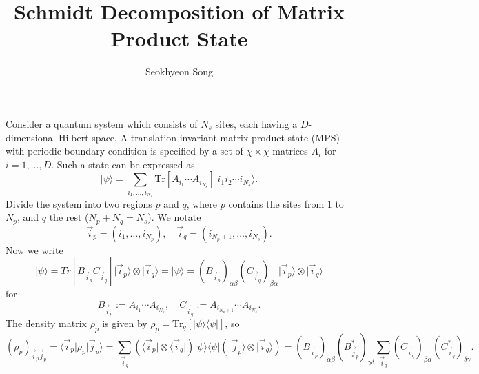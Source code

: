 \documentclass[11pt]{article}
\renewcommand\bra[1]{{\langle{#1}|}}
\renewcommand\ket[1]{{|{#1}\rangle}}
\begin{document}
	\title{Schmidt Decomposition of Matrix Product State}
	\author{Seokhyeon Song}
	\maketitle
	
	Consider a quantum system which consists of $N_{s}$ sites, each having a $D$-dimensional Hilbert space.
	A translation-invariant matrix product state (MPS) with periodic boundary condition is specified by a set of $\chi\times\chi$ matrices $A_{i}$ for $i=1,\dots,D$.
	Such a state can be expressed as
	\[\ket{\psi}=\sum_{i_{1},\dots,i_{N_{s}}}\mathrm{Tr}[A_{i_{1}}\cdots A_{i_{N_{s}}}]\ket{i_{1}i_{2}\cdots i_{N_{s}}}.\]
	Divide the system into two regions $p$ and $q$, where $p$ contains the sites from $1$ to $N_{p}$, and $q$ the rest ($N_{p}+N_{q}=N_{s}$).
	We notate
	\[\vec{i}_{p}=(i_{1},\dots,i_{N_{p}}),\quad\vec{i}_{q}=(i_{N_{p}+1},\dots,i_{N_{s}}).\]
	Now we write
	\[\ket{\psi}=Tr[B_{\vec{i}_{p}}C_{\vec{i}_{q}}]\ket{\vec{i}_{p}}\otimes\ket{\vec{i}_{q}}=\ket{\psi}=(B_{\vec{i}_{p}})_{\alpha\beta}(C_{\vec{i}_{q}})_{\beta\alpha}\ket{\vec{i}_{p}}\otimes\ket{\vec{i}_{q}}\]
	for
	\[B_{\vec{i}_{p}}:=A_{i_{1}}\cdots A_{i_{N_{p}}},\quad C_{\vec{i}_{q}}:=A_{i_{N_{p}+1}}\cdots A_{i_{N_{s}}}.\]
	The density matrix $\rho_{p}$ is given by $\rho_{p}=\mathrm{Tr}_{q}[\ket{\psi}\bra{\psi}]$, so
	\[(\rho_{p})_{\vec{i}_{p}\vec{j}_{p}}=\bra{\vec{i}_{p}}\rho_{p}\ket{\vec{j}_{p}}=\sum_{\vec{i}_{q}}(\bra{\vec{i}_{p}}\otimes\bra{\vec{i}_{q}})\ket{\psi}\bra{\psi}(\ket{\vec{j}_{p}}\otimes\ket{\vec{i}_{q}})=(B_{\vec{i}_{p}})_{\alpha\beta}(B_{\vec{j}_{p}}^{\ast})_{\gamma\delta}\sum_{\vec{i}_{q}}(C_{\vec{i}_{q}})_{\beta\alpha}(C_{\vec{i}_{q}}^{\ast})_{\delta\gamma}.\]
	
\end{document}
